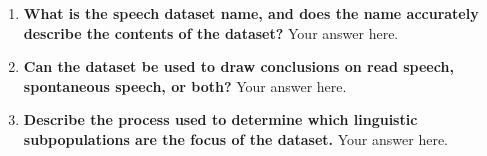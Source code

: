 \documentclass{article}
\begin{document}
    \pagestyle{fancy}
    \fancyhead{} %

    \twocolumn
    \noindent{}
    \begin{enumerate}[leftmargin=0.65cm]
    \scriptsize
        
        \item \textbf{What is the speech dataset name, and does the name accurately describe the contents of the dataset?} 
        \newline 
        Your answer here.
        \newline 
        
        
        \item \textbf{Can the dataset be used to draw conclusions on read speech, spontaneous speech, or both?}
        \newline 
       Your answer here.
        \newline 
        
        \item \textbf{Describe the process used to determine which linguistic subpopulations are the focus of the dataset.}
        \newline 
        Your answer here.
        \newline 
    
    \end{enumerate}
    
    \noindent{}
    
\end{document}
